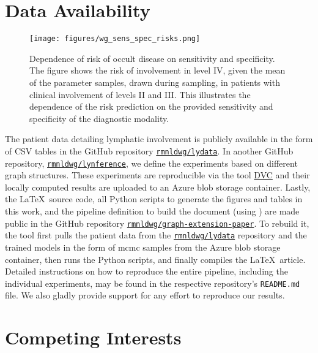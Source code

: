 \documentclass[twocolumn]{article}
\begin{document}
\section*{Data Availability}

\begin{figure}[!b]
    \begin{centering}
        \texttt{[image: figures/wg\_sens\_spec\_risks.png]}
        \caption{Dependence of risk of occult disease on sensitivity and specificity. The figure shows the risk of involvement in level IV, given the mean of the parameter samples, drawn during sampling, in patients with clinical involvement of levels II and III. This illustrates the dependence of the risk prediction on the provided sensitivity and specificity of the diagnostic modality. \label{fig:wg_sens_spec_risks}}
    \end{centering}
\end{figure}

The patient data detailing lymphatic involvement is publicly available in the form of CSV tables in the GitHub repository \href{https://github.com/rmnldwg/lydata}{\texttt{rmnldwg/lydata}}. In another GitHub repository, \href{https://github.com/rmnldwg/lynference}{\texttt{rmnldwg/lynference}}, we define the experiments based on different graph structures. These experiments are reproducible via the tool \href{https://dvc.org}{DVC} and their locally computed results are uploaded to an Azure blob storage container. Lastly, the \LaTeX\ source code, all Python scripts to generate the figures and tables in this work, and the pipeline definition to build the document (using \showyourwork \cite{luger_mapping_2021}) are made public in the GitHub repository \href{https://github.com/rmnldwg/graph-extension-paper}{\texttt{rmnldwg/graph-extension-paper}}. To rebuild it, the \showyourwork tool first pulls the patient data from the \href{https://github.com/rmnldwg/lydata}{\texttt{rmnldwg/lydata}} repository and the trained models in the form of \gls{mcmc} samples from the Azure blob storage container, then runs the Python scripts, and finally compiles the \LaTeX\ article. Detailed instructions on how to reproduce the entire pipeline, including the individual experiments, may be found in the respective repository's \texttt{README.md} file. We also gladly provide support for any effort to reproduce our results.


\section*{Competing Interests}
\end{document}
